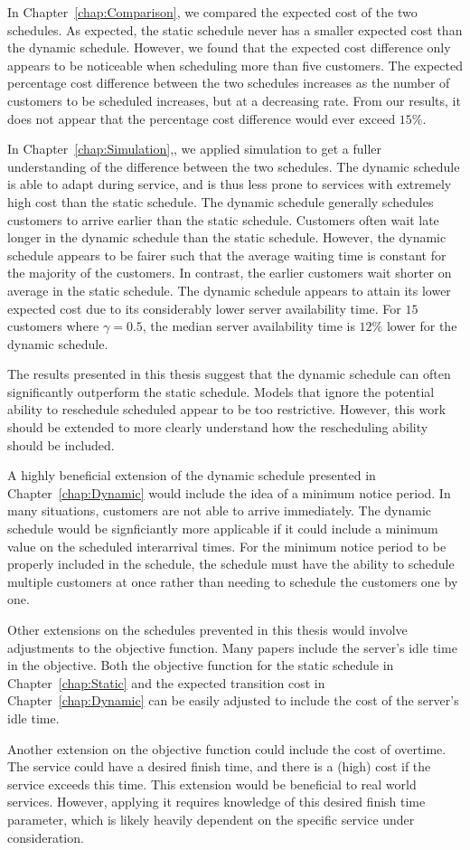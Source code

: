 In Chapter~\ref{chap:Comparison}, we compared the expected cost of the two schedules. As expected, the static schedule never has a smaller expected cost than the dynamic schedule. However, we found that the expected cost difference only appears to be noticeable when scheduling more than five customers. The expected percentage cost difference between the two schedules increases as the number of customers to be scheduled increases, but at a decreasing rate. From our results, it does not appear that the percentage cost difference would ever exceed $15 \%$.

In Chapter~\ref{chap:Simulation},, we applied simulation to get a fuller understanding of the difference between the two schedules. The dynamic schedule is able to adapt during service, and is thus less prone to services with extremely high cost than the static schedule. The dynamic schedule generally schedules customers to arrive earlier than the static schedule. Customers often wait late longer in the dynamic schedule than the static schedule. However, the dynamic schedule appears to be fairer such that the average waiting time is constant for the majority of the customers. In contrast, the earlier customers wait shorter on average in the static schedule. The dynamic schedule appears to attain its lower expected cost due to its considerably lower server availability time. For $15$ customers where $\gamma = 0.5$, the median server availability time is $12 \%$ lower for the dynamic schedule.

The results presented in this thesis suggest that the dynamic schedule can often significantly outperform the static schedule. Models that ignore the potential ability to reschedule scheduled appear to be too restrictive. However, this work should be extended to more clearly understand how the rescheduling ability should be included.

A highly beneficial extension of the dynamic schedule presented in Chapter~\ref{chap:Dynamic} would include the idea of a minimum notice period. In many situations, customers are not able to arrive immediately. The dynamic schedule would be signficiantly more applicable if it could include a minimum value on the scheduled interarrival times. For the minimum notice period to be properly included in the schedule, the schedule must have the ability to schedule multiple customers at once rather than needing to schedule the customers one by one.

Other extensions on the schedules prevented in this thesis would involve adjustments to the objective function. Many papers include the server's idle time in the objective. Both the objective function for the static schedule in Chapter~\ref{chap:Static} and the expected transition cost in Chapter~\ref{chap:Dynamic} can be easily adjusted to include the cost of the server's idle time.

Another extension on the objective function could include the cost of overtime. The service could have a desired finish time, and there is a (high) cost if the service exceeds this time. This extension would be beneficial to real world services. However, applying it requires knowledge of this desired finish time parameter, which is likely heavily dependent on the specific service under consideration.